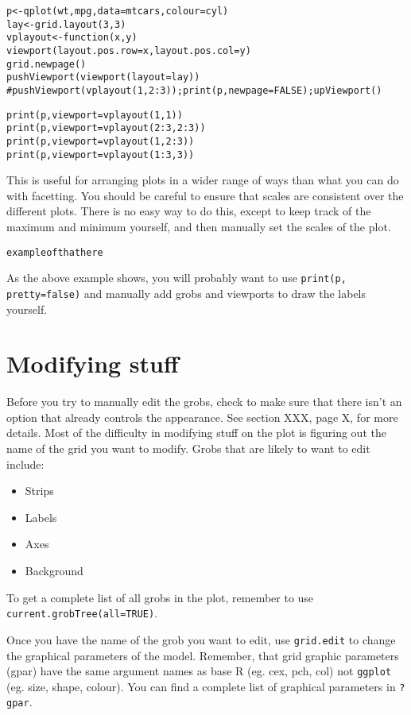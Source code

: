 \begin{alltt}
p <- qplot(wt, mpg, data=mtcars, colour=cyl)
lay <- grid.layout(3,3)
vplayout <- function(x, y) 
  viewport(layout.pos.row=x, layout.pos.col=y)
grid.newpage()
pushViewport(viewport(layout=lay))
#pushViewport(vplayout(1,2:3)); print(p, newpage=FALSE); upViewport()

print(p, viewport=vplayout(1,1))
print(p, viewport=vplayout(2:3,2:3))
print(p, viewport=vplayout(1, 2:3))
print(p, viewport=vplayout(1:3, 3))
\end{alltt}

This is useful for arranging plots in a wider range of ways than what you can do with facetting.   You should be careful to ensure that scales are consistent over the different plots.  There is no easy way to do this, except to keep track of the maximum and minimum yourself, and then manually set the scales of the plot.

\begin{alltt}
	example of that here
\end{alltt}

As the above example shows, you will probably want to use {\tt print(p, pretty=false)} and manually add grobs and viewports to draw the labels yourself.
 
\section{Modifying stuff}\label{sec:modifying_stuff}

Before you try to manually edit the grobs, check to make sure that there isn't an option that already controls the appearance.  See section XXX, page X, for more details.  Most of the difficulty in modifying stuff on the plot is figuring out the name of the grid you want to modify.  Grobs that are likely to want to edit include:

\begin{itemize}
	\item Strips
	\item Labels
	\item Axes
	\item Background
\end{itemize}

To get a complete list of all grobs in the plot, remember to use {\tt current.grobTree(all=TRUE)}.  

Once you have the name of the grob you want to edit, use  {\tt grid.edit} to change the graphical parameters of the model.  Remember, that grid graphic parameters (gpar) have the same argument names as base R (eg. cex, pch, col) not {\tt ggplot} (eg. size, shape, colour).  You can find a complete list of graphical parameters in {\tt ?gpar}.

